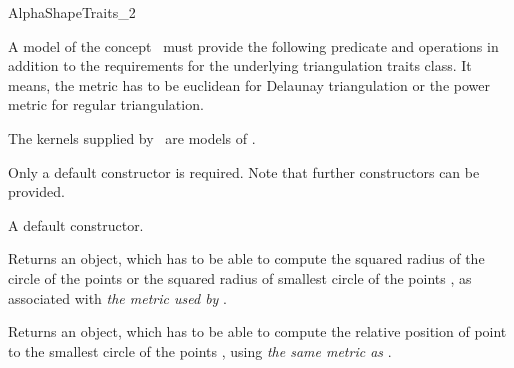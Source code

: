 \begin{ccRefConcept} {AlphaShapeTraits_2}


\ccDefinition
A model of the concept \ccRefName\  must provide the following predicate and
operations in addition to the requirements for the underlying triangulation
traits class.
It means, the metric has to be euclidean for Delaunay triangulation or the power 
metric for regular triangulation.

\ccRefines
{}


\ccHasModels

The kernels supplied by \cgal\ are models of \ccRefName. 


\ccTypes


\ccCreation

Only a default constructor is required. Note that further constructors
can be provided. 

{A default constructor.}


{Returns an object, which has to be able to compute the squared radius of the
circle of the points  or the squared radius of smallest  circle
of the points , as  associated with {\em the metric used
by }.} 


{Returns an object, which has to be able to compute the relative position of
point  to the smallest circle of the points , using
{\em the same metric as }.}

\end{ccRefConcept}

